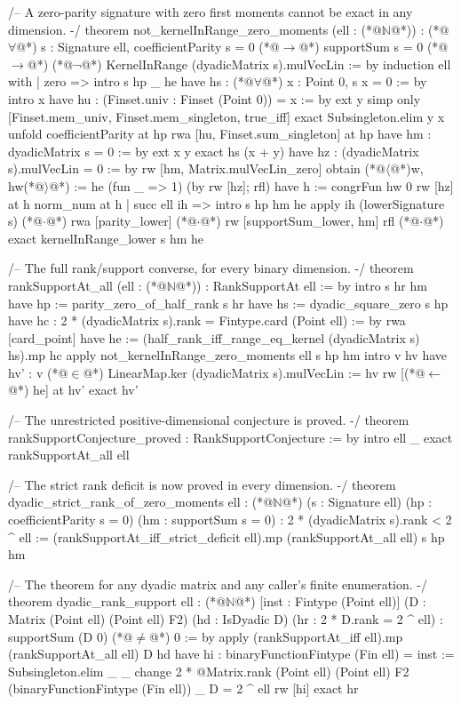 /-- A zero-parity signature with zero first moments cannot be exact in any dimension. -/
theorem not_kernelInRange_zero_moments (ell : (*@$\mathbb{N}$@*)) :
    (*@$\forall$@*) s : Signature ell, coefficientParity s = 0 (*@$\to$@*) supportSum s = 0 (*@$\to$@*)
      (*@$\neg$@*) KernelInRange (dyadicMatrix s).mulVecLin := by
  induction ell with
  | zero =>
    intro s hp _ he
    have hs : (*@$\forall$@*) x : Point 0, s x = 0 := by
      intro x
      have hu : (Finset.univ : Finset (Point 0)) = {x} := by
        ext y
        simp only [Finset.mem_univ, Finset.mem_singleton, true_iff]
        exact Subsingleton.elim y x
      unfold coefficientParity at hp
      rwa [hu, Finset.sum_singleton] at hp
    have hm : dyadicMatrix s = 0 := by
      ext x y
      exact hs (x + y)
    have hz : (dyadicMatrix s).mulVecLin = 0 := by rw [hm, Matrix.mulVecLin_zero]
    obtain (*@$\langle$@*)w, hw(*@$\rangle$@*) := he (fun _ => 1) (by rw [hz]; rfl)
    have h := congrFun hw 0
    rw [hz] at h
    norm_num at h
  | succ ell ih =>
    intro s hp hm he
    apply ih (lowerSignature s)
    (*@$\cdot$@*) rwa [parity_lower]
    (*@$\cdot$@*) rw [supportSum_lower, hm]
      rfl
    (*@$\cdot$@*) exact kernelInRange_lower s hm he

/-- The full rank/support converse, for every binary dimension. -/
theorem rankSupportAt_all (ell : (*@$\mathbb{N}$@*)) : RankSupportAt ell := by
  intro s hr hm
  have hp := parity_zero_of_half_rank s hr
  have hs := dyadic_square_zero s hp
  have hc : 2 * (dyadicMatrix s).rank = Fintype.card (Point ell) := by
    rwa [card_point]
  have he := (half_rank_iff_range_eq_kernel (dyadicMatrix s) hs).mp hc
  apply not_kernelInRange_zero_moments ell s hp hm
  intro v hv
  have hv' : v (*@$\in$@*) LinearMap.ker (dyadicMatrix s).mulVecLin := hv
  rw [(*@$\leftarrow$@*) he] at hv'
  exact hv'

/-- The unrestricted positive-dimensional conjecture is proved. -/
theorem rankSupportConjecture_proved : RankSupportConjecture := by
  intro ell _
  exact rankSupportAt_all ell

/-- The strict rank deficit is now proved in every dimension. -/
theorem dyadic_strict_rank_of_zero_moments {ell : (*@$\mathbb{N}$@*)} (s : Signature ell)
    (hp : coefficientParity s = 0) (hm : supportSum s = 0) :
    2 * (dyadicMatrix s).rank < 2 ^ ell :=
  (rankSupportAt_iff_strict_deficit ell).mp (rankSupportAt_all ell) s hp hm

/-- The theorem for any dyadic matrix and any caller's finite enumeration. -/
theorem dyadic_rank_support {ell : (*@$\mathbb{N}$@*)} [inst : Fintype (Point ell)]
    (D : Matrix (Point ell) (Point ell) F2) (hd : IsDyadic D)
    (hr : 2 * D.rank = 2 ^ ell) : supportSum (D 0) (*@$\ne$@*) 0 := by
  apply (rankSupportAt_iff ell).mp (rankSupportAt_all ell) D hd
  have hi : binaryFunctionFintype (Fin ell) = inst := Subsingleton.elim _ _
  change 2 * @Matrix.rank (Point ell) (Point ell) F2
    (binaryFunctionFintype (Fin ell)) _ D = 2 ^ ell
  rw [hi]
  exact hr

